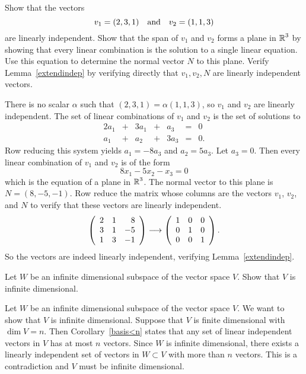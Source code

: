 \documentclass{ximera}
\begin{document}
\begin{exercise} \label{c5.6.3}
Show that the vectors
\[
v_1=(2,3,1) \quad\mbox{and}\quad v_2=(1,1,3)
\]
are linearly independent.   Show that the span of $v_1$ and $v_2$
forms a plane in $\mbox{$\Bbb{R}$}^3$ by showing that every linear combination
 is the solution to a single linear equation.  Use this equation
to determine the normal vector $N$ to this plane.  Verify
Lemma~\ref{extendindep} by verifying directly that $v_1,v_2,N$
are linearly independent vectors.

\begin{solution}

There is no scalar $\alpha$ such that $(2,3,1) = \alpha(1,1,3)$, so
$v_1$ and $v_2$ are linearly independent.
The set of linear combinations of $v_1$ and $v_2$ is the set of
solutions to
\[
\begin{array}{rrrrrrl}
2a_1 & + & 3a_1 & + & a_3 & = & 0 \\
a_1 & + & a_2 & + & 3a_3 & = & 0. \end{array}
\]
Row reducing this system yields $a_1 = -8a_3$ and $a_2 = 5a_3$.
Let $a_3 = 0$.  Then every linear combination of $v_1$ and $v_2$ is
of the form
\[
8x_1 - 5x_2 - x_3 = 0
\]
which is the equation of a plane in $\mbox{$\Bbb{R}$}^3$.  The normal vector to this
plane is $N = (8,-5,-1)$.  Row reduce the matrix whose columns
are the vectors $v_1$, $v_2$, and $N$ to verify that these vectors
are linearly independent.
\[
\left(\begin{array}{rrr} 2 & 1 & 8 \\ 3 & 1 & -5 \\ 1 & 3 & -1\end{array}\right) \longrightarrow
\left(\begin{array}{rrr} 1 & 0 & 0 \\ 0 & 1 & 0 \\ 0 & 0 & 1\end{array}\right).
\]
So the vectors are indeed linearly independent, verifying
Lemma~\ref{extendindep}.

\end{solution}
\end{exercise}

\begin{exercise}  \label{c5.6.3A}
Let $W$ be an infinite dimensional subspace of the vector space $V$.
Show that $V$ is infinite dimensional.

\begin{solution}
Let $W$ be an infinite dimensional subspace of the vector 
space $V$.  We want to show that $V$ is infinite dimensional.  Suppose that
$V$ is finite dimensional with $\dim V=n$.  Then Corollary~\ref{basis<n}
states that any set of linear independent 
vectors in $V$ has at most $n$ vectors.  Since $W$ is infinite dimensional, 
there exists a linearly independent set of vectors in $W\subset V$ with more 
than $n$ vectors.  This is a contradiction and $V$ must be infinite 
dimensional.

\end{solution}
\end{exercise}
\end{document}
